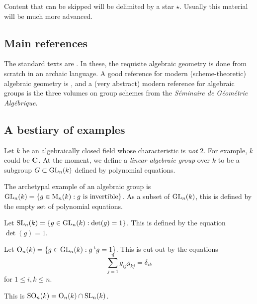 Content that can be skipped will be delimited by a star $\star$. Usually 
this material will be much more advanced. 





\subsection{Main references}

The standard texts are \cite{borel-1991,humphreys-1975,springer-2009}. In 
these, the requisite algebraic geometry is done from scratch in an archaic 
language. A good reference for modern (scheme-theoretic) algebraic geometry is 
\cite{hartshorne-1977}, and a (very abstract) modern reference for algebraic 
groups is the three volumes on group schemes \cite{sga3-i,sga3-ii,sga3-iii} 
from the \emph{S\'eminaire de G\'eom\'etrie Alg\'ebrique}. 





\subsection{A bestiary of examples}

Let $k$ be an algebraically closed field whose characteristic is \emph{not} 
$2$. For example, $k$ could be $\mathbf{C}$. At the moment, we define a 
\emph{linear algebraic group} over $k$ to be a subgroup $G\subset \operatorname{GL}_n(k)$ 
defined by polynomial equations. 

\begin{example}
The archetypal example of an algebraic group is 
$\operatorname{GL}_n(k)=\{g\in \operatorname{M}_n(k):g\text{ is invertible}\}$. As a subset of 
$\operatorname{GL}_n(k)$, this is defined by the empty set of polynomial equations. 
\end{example}

\begin{example}
Let $\operatorname{SL}_n(k)=\{g\in \operatorname{GL}_n(k):\det(g)=1\}$. This is defined by the equation 
$\det(g)=1$. 
\end{example}

\begin{example}[Orthogonal]
Let $\operatorname{O}_n(k)=\{g\in \operatorname{GL}_n(k):g \prescript{\mathrm{t}}{}{g}=1\}$. This is cut 
out by the equations 
\[
  \sum_{j=1}^n g_{i j} g_{k j} = \delta_{i k}
\]
for $1\leqslant i,k\leqslant n$. 
\end{example}

\begin{example}
This is $\operatorname{SO}_n(k)=\operatorname{O}_n(k)\cap \operatorname{SL}_n(k)$. 
\end{example}

